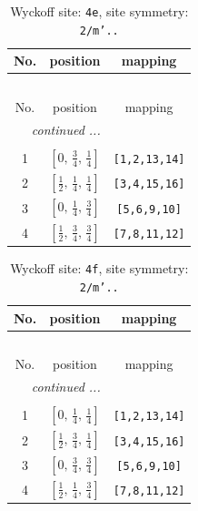 \documentclass[fleqn,8pt]{jsarticle}
\begin{document}
\renewcommand{\arraystretch}{1.2}
\begin{longtable}{ccc}
\caption{Wyckoff site: {\tt 4e}, site symmetry: {\tt 2/m'..}}
 \\
 \hline \hline
No. & position & mapping \\ \hline \endfirsthead

\multicolumn{2}{l}{\tablename\ \thetable{}} \\
 \hline \hline
No. & position & mapping \\ \hline \endhead

 \hline \hline
\multicolumn{2}{r}{\footnotesize\it continued ...} \\ \endfoot

 \hline \hline
\multicolumn{2}{r}{} \\ \endlastfoot

1 & $\left[ 0,\, \frac{3}{4},\, \frac{1}{4} \right]$ & {\tt [1,2,13,14]} \\ \hline
2 & $\left[ \frac{1}{2},\, \frac{1}{4},\, \frac{1}{4} \right]$ & {\tt [3,4,15,16]} \\ \hline
3 & $\left[ 0,\, \frac{1}{4},\, \frac{3}{4} \right]$ & {\tt [5,6,9,10]} \\ \hline
4 & $\left[ \frac{1}{2},\, \frac{3}{4},\, \frac{3}{4} \right]$ & {\tt [7,8,11,12]} \\
\end{longtable}
\renewcommand{\arraystretch}{1.2}
\begin{longtable}{ccc}
\caption{Wyckoff site: {\tt 4f}, site symmetry: {\tt 2/m'..}}
 \\
 \hline \hline
No. & position & mapping \\ \hline \endfirsthead

\multicolumn{2}{l}{\tablename\ \thetable{}} \\
 \hline \hline
No. & position & mapping \\ \hline \endhead

 \hline \hline
\multicolumn{2}{r}{\footnotesize\it continued ...} \\ \endfoot

 \hline \hline
\multicolumn{2}{r}{} \\ \endlastfoot

1 & $\left[ 0,\, \frac{1}{4},\, \frac{1}{4} \right]$ & {\tt [1,2,13,14]} \\ \hline
2 & $\left[ \frac{1}{2},\, \frac{3}{4},\, \frac{1}{4} \right]$ & {\tt [3,4,15,16]} \\ \hline
3 & $\left[ 0,\, \frac{3}{4},\, \frac{3}{4} \right]$ & {\tt [5,6,9,10]} \\ \hline
4 & $\left[ \frac{1}{2},\, \frac{1}{4},\, \frac{3}{4} \right]$ & {\tt [7,8,11,12]} \\
\end{longtable}
\end{document}

